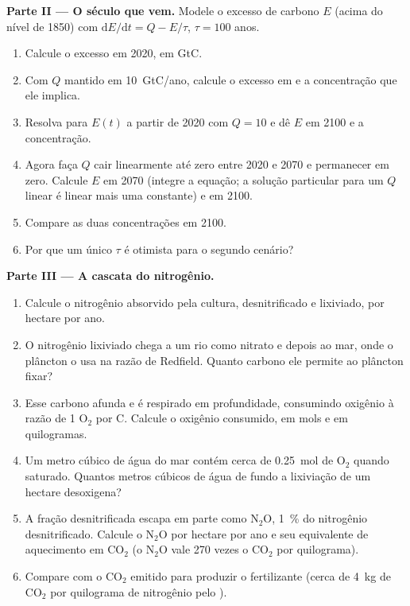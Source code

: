 \begin{problem}
\medskip
\noindent\textbf{Parte II --- O século que vem.}
Modele o excesso de carbono $E$ (acima do nível de 1850) com
$\mathrm{d}E/\mathrm{d}t = Q - E/\tau$, $\tau = 100$ anos.
\begin{enumerate}[resume]
  \item Calcule o excesso em 2020, em GtC.
  \item Com $Q$ mantido em \qty{10}{GtC/ano}, calcule o excesso em  e a concentração que ele implica.
  \item Resolva para $E(t)$ a partir de 2020 com $Q = 10$ e dê $E$ em
        2100 e a concentração.
  \item Agora faça $Q$ cair linearmente até zero entre 2020 e 2070 e
        permanecer em zero. Calcule $E$ em 2070 (integre a equação;
        a solução particular para um $Q$ linear é linear mais uma
        constante) e em 2100.
  \item Compare as duas concentrações em 2100.
  \item Por que um único $\tau$ é otimista para o segundo cenário?
\end{enumerate}

\medskip
\noindent\textbf{Parte III --- A cascata do nitrogênio.}
\begin{enumerate}[resume]
  \item Calcule o nitrogênio absorvido pela cultura, desnitrificado e
        lixiviado, por hectare por ano.
  \item O nitrogênio lixiviado chega a um rio como nitrato e depois ao
        mar, onde o plâncton o usa na razão de Redfield. Quanto
        carbono ele permite ao plâncton fixar?
  \item Esse carbono afunda e é respirado em profundidade, consumindo
        oxigênio à razão de 1 $\mathrm{O_2}$ por C. Calcule o oxigênio consumido, em
        mols e em quilogramas.
  \item Um metro cúbico de água do mar contém cerca de \qty{0.25}{mol} de
        $\mathrm{O_2}$ quando saturado. Quantos metros cúbicos de água de fundo
        a lixiviação de um hectare desoxigena?
  \item A fração desnitrificada escapa em parte como $\mathrm{N_2O}$,
        \qty{1}{\%} do nitrogênio desnitrificado. Calcule o $\mathrm{N_2O}$
        por hectare por ano e seu equivalente de aquecimento em $\mathrm{CO_2}$
        (o $\mathrm{N_2O}$ vale 270 vezes o $\mathrm{CO_2}$ por quilograma).
  \item Compare com o $\mathrm{CO_2}$ emitido para produzir o fertilizante
        (cerca de \qty{4}{kg} de $\mathrm{CO_2}$ por quilograma de nitrogênio
        pelo ).
\end{enumerate}


\end{problem}

